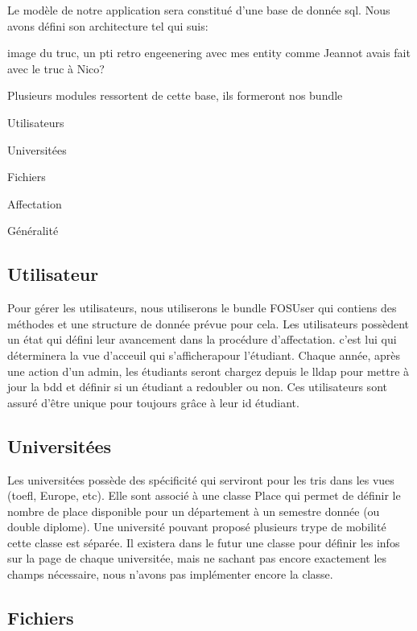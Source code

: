 Le modèle de notre application sera constitué d'une base de donnée sql. Nous avons défini son architecture tel qui suis:

image du truc, un pti retro engeenering avec mes entity comme Jeannot avais fait avec le truc à Nico?

\subject{Les modules}
Plusieurs modules ressortent de cette base, ils formeront nos bundle
\begin{itemsize}
\item Utilisateurs
\item Universitées
\item Fichiers
\item Affectation
\item Généralité
\end{itemsize}

\subsection{Utilisateur}

Pour gérer les utilisateurs, nous utiliserons le bundle FOSUser qui contiens des méthodes et une structure de donnée prévue pour cela.
Les utilisateurs possèdent un état qui défini leur avancement dans la procédure d'affectation. c'est lui qui déterminera la vue d'acceuil qui s'afficherapour l'étudiant. 
Chaque année, après une action d'un admin, les étudiants seront chargez depuis le lldap pour mettre à jour la bdd et définir si un étudiant a redoubler ou non.
Ces utilisateurs sont assuré d'être unique pour toujours grâce à leur id étudiant.

\subsection{Universitées}

Les universitées possède des spécificité qui serviront pour les tris dans les vues (toefl, Europe, etc).
Elle sont associé à une classe Place qui permet de définir le nombre de place disponible pour un département à un semestre donnée (ou double diplome). Une université pouvant proposé plusieurs trype de mobilité cette classe est séparée.
Il existera dans le futur une classe pour définir les infos sur la page de chaque universitée, mais ne sachant pas encore exactement les champs nécessaire, nous n'avons pas implémenter encore la classe.

\subsection{Fichiers}


